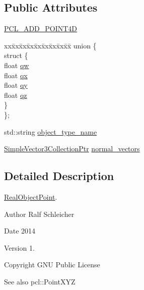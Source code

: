 \subsection*{\-Public \-Attributes}
\begin{DoxyCompactItemize}
\item 
\hyperlink{structnext__best__view_1_1RealObjectPoint_af685e39eda47853104fdc9d0d7d23b6e}{\-P\-C\-L\-\_\-\-A\-D\-D\-\_\-\-P\-O\-I\-N\-T4\-D}
\item 
\begin{tabbing}
xx\=xx\=xx\=xx\=xx\=xx\=xx\=xx\=xx\=\kill
union \{\\
\>struct \{\\
\>\>float \hyperlink{structnext__best__view_1_1RealObjectPoint_acb30e8af867191f0c1ddcb3c10001357}{qw}\\
\>\>float \hyperlink{structnext__best__view_1_1RealObjectPoint_a6254ae5f0bb6518cff87833de21c2023}{qx}\\
\>\>float \hyperlink{structnext__best__view_1_1RealObjectPoint_ac5013d4372bf66629c9b98745d1ef478}{qy}\\
\>\>float \hyperlink{structnext__best__view_1_1RealObjectPoint_a2f439a91de038205eb2341ce655c2f98}{qz}\\
\>\} \\
\}; \\

\end{tabbing}\item 
std\-::string \hyperlink{structnext__best__view_1_1RealObjectPoint_a4df0f9928cffd8a217e158a679f5991d}{object\-\_\-type\-\_\-name}
\item 
\hyperlink{namespacenext__best__view_ad0c836f196d199ad5f3b89c2eb24e96e}{\-Simple\-Vector3\-Collection\-Ptr} \hyperlink{structnext__best__view_1_1RealObjectPoint_a6dd321f5ca1be1e3d90a3ed6cac71c2c}{normal\-\_\-vectors}
\end{DoxyCompactItemize}


\subsection{\-Detailed \-Description}
\hyperlink{structnext__best__view_1_1RealObjectPoint}{\-Real\-Object\-Point}. 

\begin{DoxyAuthor}{\-Author}
\-Ralf \-Schleicher 
\end{DoxyAuthor}
\begin{DoxyDate}{\-Date}
2014 
\end{DoxyDate}
\begin{DoxyVersion}{\-Version}
1. 
\end{DoxyVersion}
\begin{DoxyCopyright}{\-Copyright}
\-G\-N\-U \-Public \-License 
\end{DoxyCopyright}
\begin{DoxySeeAlso}{\-See also}
pcl\-::\-Point\-X\-Y\-Z 
\end{DoxySeeAlso}


